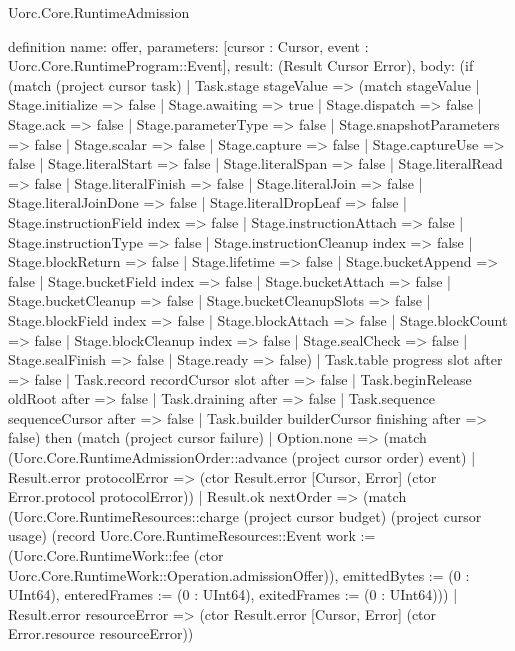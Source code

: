 \begin{lexlean}{Uorc.Core.RuntimeAdmission}
\begin{semanticmodule}
definition{
  name: offer,
  parameters: [cursor : Cursor, event : Uorc.Core.RuntimeProgram::Event],
  result: (Result Cursor Error),
  body: (if (match (project cursor task)
    | Task.stage stageValue => (match stageValue
      | Stage.initialize => false
      | Stage.awaiting => true
      | Stage.dispatch => false
      | Stage.ack => false
      | Stage.parameterType => false
      | Stage.snapshotParameters => false
      | Stage.scalar => false
      | Stage.capture => false
      | Stage.captureUse => false
      | Stage.literalStart => false
      | Stage.literalSpan => false
      | Stage.literalRead => false
      | Stage.literalFinish => false
      | Stage.literalJoin => false
      | Stage.literalJoinDone => false
      | Stage.literalDropLeaf => false
      | Stage.instructionField index => false
      | Stage.instructionAttach => false
      | Stage.instructionType => false
      | Stage.instructionCleanup index => false
      | Stage.blockReturn => false
      | Stage.lifetime => false
      | Stage.bucketAppend => false
      | Stage.bucketField index => false
      | Stage.bucketAttach => false
      | Stage.bucketCleanup => false
      | Stage.bucketCleanupSlots => false
      | Stage.blockField index => false
      | Stage.blockAttach => false
      | Stage.blockCount => false
      | Stage.blockCleanup index => false
      | Stage.sealCheck => false
      | Stage.sealFinish => false
      | Stage.ready => false)
    | Task.table progress slot after => false
    | Task.record recordCursor slot after => false
    | Task.beginRelease oldRoot after => false
    | Task.draining after => false
    | Task.sequence sequenceCursor after => false
    | Task.builder builderCursor finishing after => false) then (match (project cursor failure)
    | Option.none => (match (Uorc.Core.RuntimeAdmissionOrder::advance (project cursor order) event)
      | Result.error protocolError => (ctor Result.error [Cursor, Error] (ctor Error.protocol protocolError))
      | Result.ok nextOrder => (match (Uorc.Core.RuntimeResources::charge (project cursor budget) (project cursor usage) (record Uorc.Core.RuntimeResources::Event {work := (Uorc.Core.RuntimeWork::fee (ctor Uorc.Core.RuntimeWork::Operation.admissionOffer)), emittedBytes := (0 : UInt64), enteredFrames := (0 : UInt64), exitedFrames := (0 : UInt64)}))
        | Result.error resourceError => (ctor Result.error [Cursor, Error] (ctor Error.resource resourceError))
}
\end{semanticmodule}
\end{lexlean}
